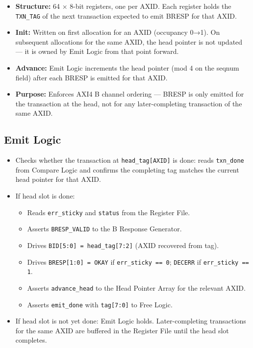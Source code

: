 \documentclass[11pt,a4paper]{article}
\begin{document}
\begin{itemize}
  \item \textbf{Structure:} 64 × 8-bit registers, one per AXID.
        Each register holds the \texttt{TXN\_TAG} of the next
        transaction expected to emit BRESP for that AXID.
  \item \textbf{Init:} Written on first allocation for an AXID
        (occupancy 0→1). On subsequent allocations for the same AXID,
        the head pointer is not updated — it is owned by Emit Logic
        from that point forward.
  \item \textbf{Advance:} Emit Logic increments the head pointer
        (mod 4 on the seqnum field) after each BRESP is emitted for
        that AXID.
  \item \textbf{Purpose:} Enforces AXI4 B channel ordering — BRESP
        is only emitted for the transaction at the head, not for
        any later-completing transaction of the same AXID.
\end{itemize}

\subsection{Emit Logic}

\begin{itemize}
  \item Checks whether the transaction at \texttt{head\_tag[AXID]} is
        done: reads \texttt{txn\_done} from Compare Logic and confirms
        the completing tag matches the current head pointer for that
        AXID.
  \item If head slot is done:
  \begin{itemize}
    \item Reads \texttt{err\_sticky} and \texttt{status} from the
          Register File.
    \item Asserts \texttt{BRESP\_VALID} to the B Response Generator.
    \item Drives \texttt{BID[5:0] = head\_tag[7:2]} (AXID recovered
          from tag).
    \item Drives \texttt{BRESP[1:0] = OKAY} if \texttt{err\_sticky
          == 0}; \texttt{DECERR} if \texttt{err\_sticky == 1}.
    \item Asserts \texttt{advance\_head} to the Head Pointer Array
          for the relevant AXID.
    \item Asserts \texttt{emit\_done} with \texttt{tag[7:0]} to Free
          Logic.
  \end{itemize}
  \item If head slot is not yet done: Emit Logic holds. Later-completing
        transactions for the same AXID are buffered in the Register File
        until the head slot completes.
\end{itemize}
\end{document}
